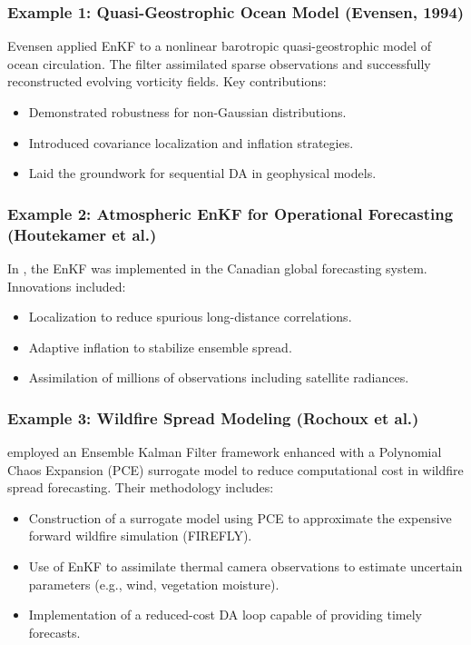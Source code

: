 \documentclass[a4paper]{article}
\begin{document}
\subsubsection*{Example 1: Quasi-Geostrophic Ocean Model (Evensen, 1994)}

Evensen applied EnKF to a nonlinear barotropic quasi-geostrophic model of ocean circulation. The filter assimilated sparse observations and successfully reconstructed evolving vorticity fields. Key contributions:
\begin{itemize}
  \item Demonstrated robustness for non-Gaussian distributions.
  \item Introduced covariance localization and inflation strategies.
  \item Laid the groundwork for sequential DA in geophysical models.
\end{itemize}

\subsubsection*{Example 2: Atmospheric EnKF for Operational Forecasting (Houtekamer et al.)}

In \textcite{houtekamer2005ensemble}, the EnKF was implemented in the Canadian global forecasting system. Innovations included:
\begin{itemize}
  \item Localization to reduce spurious long-distance correlations.
  \item Adaptive inflation to stabilize ensemble spread.
  \item Assimilation of millions of observations including satellite radiances.
\end{itemize}


\subsubsection*{Example 3: Wildfire Spread Modeling (Rochoux et al.)}

\textcite{rochoux2020towards} employed an Ensemble Kalman Filter framework enhanced with a Polynomial Chaos Expansion (PCE) surrogate model to reduce computational cost in wildfire spread forecasting. Their methodology includes:

\begin{itemize}
  \item Construction of a surrogate model using PCE to approximate the expensive forward wildfire simulation (FIREFLY).
  \item Use of EnKF to assimilate thermal camera observations to estimate uncertain parameters (e.g., wind, vegetation moisture).
  \item Implementation of a reduced-cost DA loop capable of providing timely forecasts.
\end{itemize}
\end{document}
